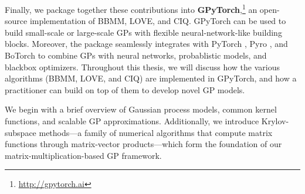 %
\noindent
Finally, we package together these contributions into {\bf GPyTorch},\footnote{
  \url{http://gpytorch.ai}
}
an open-source implementation of BBMM, LOVE, and CIQ.
GPyTorch can be used to build small-scale or large-scale GPs with flexible neural-network-like building blocks.
Moreover, the package seamlessly integrates with PyTorch \cite{paszke2019pytorch}, Pyro \cite{bingham2019pyro}, and BoTorch \cite{balandat2019botorch} to combine GPs with neural networks, probablistic models, and blackbox optimizers.
Throughout this thesis, we will discuss how the various algorithms (BBMM, LOVE, and CIQ) are implemented in GPyTorch, and how a practitioner can build on top of them to develop novel GP models.

We begin with a brief overview of Gaussian process models, common kernel functions, and scalable GP approximations.
Additionally, we introduce Krylov-subspace methods---a family of numerical algorithms that compute matrix functions through matrix-vector products---which form the foundation of our matrix-multiplication-based GP framework.
